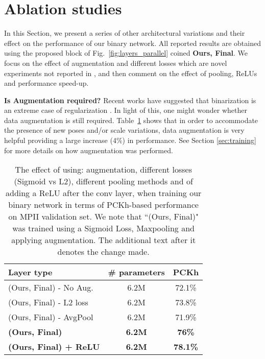 \documentclass[10pt,journal,compsoc]{IEEEtran}
\begin{document}
\section{Ablation studies} \label{sec:ablation}

In this Section, we present a series of other architectural variations and their effect on the performance of our binary network. All reported results are obtained using the proposed block of Fig.~\ref{fig:layers_parallel} coined \textbf{Ours, Final}. We focus on the effect of augmentation and different losses which are novel experiments not reported in \cite{rastegari2016xnor}, and then comment on the effect of pooling, ReLUs and performance speed-up. 

\textbf{Is Augmentation required?} Recent works have suggested that binarization is an extreme case of regularization \cite{courbariaux2015binaryconnect,courbariaux2016binarized,merolla2016deep}. In light of this, one might wonder whether data augmentation is still required.  Table~\ref{tab:aug_results} shows that in order to accommodate the presence of new poses and/or scale variations, data augmentation is very helpful providing a large increase (4\%) in performance. {\color{black} See Section \ref{sec:training} for more details on how augmentation was performed}.

\begin{table}[!htbp]
    \renewcommand{\arraystretch}{1.3}
    \caption{The effect of using:  augmentation, different losses (Sigmoid vs L2), different pooling methods and of adding a ReLU after the conv layer,  when training our binary network in terms of PCKh-based performance on MPII validation set. {\color{black}We note that ``(Ours, Final)" was trained using a Sigmoid Loss, Maxpooling and applying augmentation. The additional text after it denotes the change made.}}

    \label{tab:aug_results}
    \centering
    \begin{tabular}{|l|c|c|}
        \hline
        Layer type                    & \# parameters & PCKh          \\
        \hline\hline
        (Ours, Final) - No Aug.       & 6.2M          & 72.1\%        \\
        \hline
        (Ours, Final) - L2 loss       & 6.2M          & 73.8\%        \\
        \hline
        (Ours, Final) - AvgPool      & 6.2M          & 71.9\%        \\
        \hhline{|=|=|=|}
        
        \textbf{(Ours, Final)} & \textbf{6.2M}  & \textbf{76\%} \\
        
        \hline
        \textbf{(Ours, Final) + ReLU} & \textbf{6.2M} & \textbf{78.1\%} \\
        \hline
    \end{tabular}

\end{table}
\end{document}
